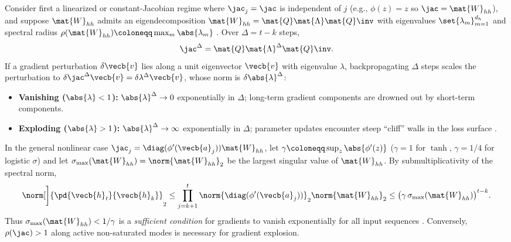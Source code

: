 \documentclass[../../../../master.tex]{subfiles}
\begin{document}
\begin{coremath}
\label{eq:rnn:spectral_box}
Consider first a linearized or constant-Jacobian regime where $\jac_j = \jac$ is independent of $j$ (e.g., $\phi(z)=z$ so $\jac = \mat{W}_{hh}$), and suppose $\mat{W}_{hh}$ admits an eigendecomposition $\mat{W}_{hh} = \mat{Q}\mat{\Lambda}\mat{Q}\inv$ with eigenvalues $\set{\lambda_m}_{m=1}^{d_h}$ and spectral radius $\rho(\mat{W}_{hh}) \coloneqq \max_m \abs{\lambda_m}$ . Over $\Delta = t - k$ steps,
\begin{equation}
  \jac^{\Delta} = \mat{Q}\mat{\Lambda}^{\Delta}\mat{Q}\inv.
  \label{eq:rnn:eig_power}
\end{equation}
If a gradient perturbation $\delta \vecb{v}$ lies along a unit eigenvector $\vecb{v}$ with eigenvalue $\lambda$, backpropagating $\Delta$ steps scales the perturbation to $\delta \jac^{\Delta}\vecb{v} = \delta \lambda^{\Delta}\vecb{v}$, whose norm is $\delta\abs{\lambda}^{\Delta}$:
\begin{itemize}
  \item \textbf{Vanishing ($\abs{\lambda} < 1$):} $\abs{\lambda}^{\Delta} \to 0$ exponentially in $\Delta$; long-term gradient components are drowned out by short-term components.
  \item \textbf{Exploding ($\abs{\lambda} > 1$):} $\abs{\lambda}^{\Delta} \to \infty$ exponentially in $\Delta$; parameter updates encounter steep ``cliff'' walls in the loss surface .
\end{itemize}
In the general nonlinear case $\jac_j = \diag(\phi'(\vecb{a}_j))\mat{W}_{hh}$, let $\gamma \coloneqq \sup_z \abs{\phi'(z)}$ ($\gamma = 1$ for $\tanh$, $\gamma = 1/4$ for logistic $\sigma$) and let $\sigma_{\max}(\mat{W}_{hh}) = \norm{\mat{W}_{hh}}_2$ be the largest singular value of $\mat{W}_{hh}$. By submultiplicativity of the spectral norm,
\begin{equation}
  \norm[\bigg]{\pd{\vecb{h}_t}{\vecb{h}_k}}_2
  \le \prod_{j=k+1}^{t} \norm{\diag(\phi'(\vecb{a}_j))}_2 \norm{\mat{W}_{hh}}_2
  \le \big(\gamma\,\sigma_{\max}(\mat{W}_{hh})\big)^{t-k}.
  \label{eq:rnn:vanishing_bound}
\end{equation}
Thus $\sigma_{\max}(\mat{W}_{hh}) < 1/\gamma$ is a \emph{sufficient condition} for gradients to vanish exponentially for all input sequences . Conversely, $\rho(\jac) > 1$ along active non-saturated modes is necessary for gradient explosion.
\end{coremath}
\end{document}
